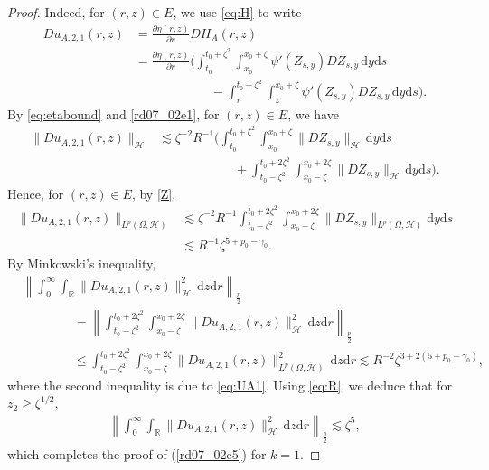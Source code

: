 \documentclass[12pt,a4paper]{article}
\newcommand{\R}{{\mathbb{R}}}
\renewcommand{\d}{\mathrm{d}}
\newcommand {\deltah}{{\zeta}}
\newcommand{\<}{\langle}
\renewcommand{\>}{\rangle}
\begin{document}
\begin{proof}
 Indeed, for $(r,z)\in E$, we use \eqref{eq:H} to write
           \begin{align*}
           Du_{A,2,1}(r,z) &= \frac{\partial \eta(r,z)}{\partial r}DH_A(r,z)\\
           &=\frac{\partial \eta(r,z)}{\partial r} \Big(\int_{t_0}^{t_0+\deltah^2}\int_{x_0}^{x_0+\deltah}\psi'(Z_{s,y})DZ_{s,y}\, \d y\d s \\
           & \qquad \qquad \qquad - \int_{r}^{t_0+\deltah^2}\int_{z}^{x_0+\deltah}\psi'(Z_{s,y})DZ_{s,y}\, \d y\d s\Big).
           \end{align*}
 By \eqref{eq:etabound} and \eqref{rd07_02e1},  for $(r,z)\in E$, we have
           \begin{align*}
           \|Du_{A,2,1}(r,z)\|_{\mathcal{H}}&\lesssim \deltah^{-2}R^{-1}\Big(\int_{t_0}^{t_0+\deltah^2}\int_{x_0}^{x_0+\deltah}\|DZ_{s,y}\|_{\mathcal{H}}\, \d y\d s \\
      &\qquad\qquad\qquad +\int_{t_0-\deltah^2}^{t_0+2\deltah^2}\int_{x_0-\deltah}^{x_0+2\deltah}\|DZ_{s,y}\|_{\mathcal{H}}\, \d y\d s\Big).
           \end{align*}
Hence, for $(r,z)\in E$, by \eqref{Z}, 
           \begin{align}\label{eq:UA1}
           \|Du_{A,2,1}(r,z)\|_{L^p(\Omega, \mathcal{H})} &\lesssim \deltah^{-2}R^{-1}
\int_{t_0-\deltah^2}^{t_0+2\deltah^2}\int_{x_0-\deltah}^{x_0+2\deltah}\|DZ_{s,y}\|_{L^p(\Omega,\mathcal{H})}\d y\d s\nonumber\\
           &\lesssim R^{-1}\deltah^{5+p_0-\gamma_0}.
           \end{align}
By Minkowski's inequality, 
           \begin{align*}
           &\left\|\int_0^\infty\int_\R \|Du_{A,2,1}(r,z)\|_\mathcal{H}^2\, \d z\d r\right\|_{\frac p2} \\
           &\qquad\qquad =\left\|\int_{t_0-\deltah^2}^{t_0+2\deltah^2}\int_{x_0-\deltah}^{x_0+2\deltah} \|Du_{A,2,1}(r,z)\|_\mathcal{H}^2\, \d z\d r\right\|_{\frac p2}\\
           &\qquad\qquad \leq \int_{t_0-\deltah^2}^{t_0+2\deltah^2}\int_{x_0-\deltah}^{x_0+2\deltah} \|Du_{A,2,1}(r,z)\|_{L^p(\Omega, \mathcal{H})}^2\, \d z\d r
           \lesssim R^{-2}\deltah^{3+2(5+p_0-\gamma_0)},
           \end{align*}
where the second inequality is due to \eqref{eq:UA1}. Using \eqref{eq:R}, 
we deduce that for $z_2\geq \deltah^{1/2}$,
           \begin{align*}
           \left\|\int_0^\infty\int_\R \|Du_{A,2,1}(r,z)\|_\mathcal{H}^2\, \d z\d r\right\|_{\frac p2} \lesssim \deltah^{5},
           \end{align*}
           which completes the proof of (\ref{rd07_02e5}) for $k=1$.
  \medskip
  

\end{proof}
\end{document}
